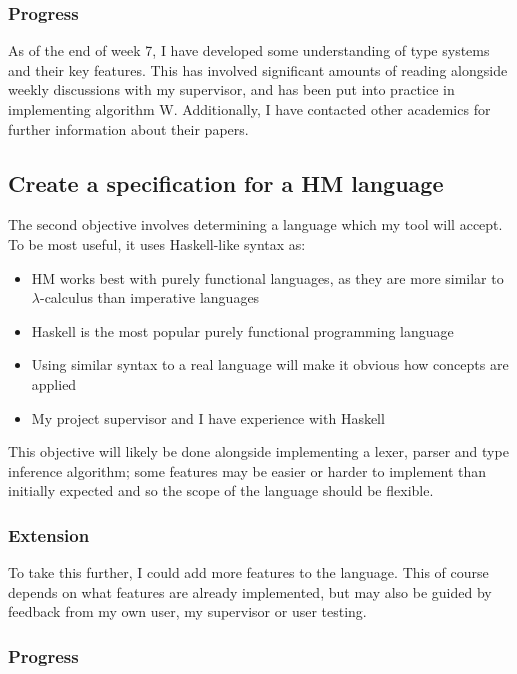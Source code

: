 \documentclass[12pt]{article}
\begin{document}
\subsubsection{Progress}

As of the end of week 7, I have developed some understanding of type systems and their key features. This has involved significant amounts of reading alongside weekly discussions with my supervisor, and has been put into practice in implementing algorithm W. Additionally, I have contacted other academics for further information about their papers.

\subsection{Create a specification for a HM language}

The second objective involves determining a language which my tool will accept. To be most useful, it uses Haskell-like syntax as:

\begin{itemize}
  \item HM works best with purely functional languages, as they are more similar to $\lambda$-calculus than imperative languages
  \item Haskell is the most popular purely functional programming language\cite{ref11}
  \item Using similar syntax to a real language will make it obvious how concepts are applied
  \item My project supervisor and I have experience with Haskell
\end{itemize}

This objective will likely be done alongside implementing a lexer, parser and type inference algorithm; some features may be easier or harder to implement than initially expected and so the scope of the language should be flexible.

\subsubsection{Extension}

To take this further, I could add more features to the language. This of course depends on what features are already implemented, but may also be guided by feedback from my own user, my supervisor or user testing.

\subsubsection{Progress}
\end{document}
